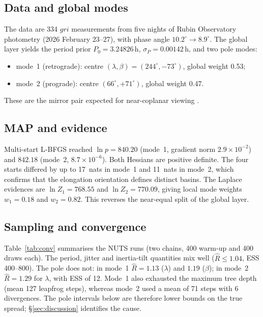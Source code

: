 \documentclass[11pt,a4paper]{article}
\theoremstyle{remark}
\begin{document}
\subsection{Data and global modes}
\label{sec:app_data}
The data are 334 $gri$ measurements from five nights of Rubin Observatory photometry
(2026 February 23--27), with phase angle $10.2^\circ\to8.9^\circ$. The global layer
\citep{lcinv_convex2026} yields the period prior $P_0=3.24826$\,h, $\sigma_P=0.00142$\,h, and two pole
modes:
\begin{itemize}[nosep]
\item mode~1 (retrograde): centre $(\lambda,\beta)=(244^\circ,-73^\circ)$, global weight 0.53;
\item mode~2 (prograde): centre $(66^\circ,+71^\circ)$, global weight 0.47.
\end{itemize}
These are the mirror pair expected for near-coplanar viewing \citep{kaasalainen2006}.

\subsection{MAP and evidence}
Multi-start L-BFGS reached $\ln p=840.20$ (mode~1, gradient norm $2.9\times10^{-2}$) and $842.18$
(mode~2, $8.7\times10^{-6}$). Both Hessians are positive definite. The four starts differed by up to
17~nats in mode~1 and 11~nats in mode~2, which confirms that the elongation orientation defines
distinct basins. The Laplace evidences are $\ln Z_1=768.55$ and $\ln Z_2=770.09$, giving local mode
weights $w_1=0.18$ and $w_2=0.82$. This reverses the near-equal split of the global layer.

\subsection{Sampling and convergence}
Table~\ref{tab:conv} summarises the NUTS runs (two chains, 400 warm-up and 400 draws each). The period,
jitter and inertia-tilt quantities mix well ($\widehat R\le1.04$, ESS 400--800). The pole does not: in
mode~1 $\widehat R=1.13$ ($\lambda$) and $1.19$ ($\beta$); in mode~2 $\widehat R=1.29$ for $\lambda$,
with ESS of 12. Mode~1 also exhausted the maximum tree depth (mean 127 leapfrog steps), whereas mode~2
used a mean of 71 steps with 6 divergences. The pole intervals below are therefore lower bounds on the
true spread; \S\ref{sec:discussion} identifies the cause.
\end{document}
